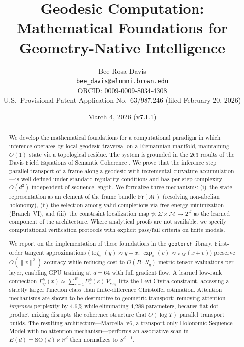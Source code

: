 \documentclass[11pt,a4paper]{article}
\title{\textbf{Geodesic Computation: \\[4pt] Mathematical Foundations for Geometry-Native Intelligence}}
\author{Bee Rosa Davis \\[2pt]
\texttt{bee\_davis@alumni.brown.edu} \\[2pt]
\small{ORCID: 0009-0009-8034-4308} \\[2pt]
\small{U.S.\ Provisional Patent Application No.\ 63/987,246 (filed February 20, 2026)}}
\date{March 4, 2026 (v7.1.1)}
\theoremstyle{definition}
\theoremstyle{remark}
\newcommand{\SO}{\mathrm{SO}}
\newcommand{\Fr}{\mathrm{Fr}}
\begin{document}
\maketitle

\begin{abstract}
We develop the mathematical foundations for a computational paradigm 
in which inference operates by local geodesic traversal on a Riemannian 
manifold, maintaining $O(1)$ state via a topological residue. The 
system is grounded in the 263 results of the Davis Field Equations of 
Semantic Coherence \cite{davis2026field,davis2026navierstokes}. We prove 
that the inference step---parallel transport of a frame along a geodesic 
with incremental curvature accumulation---is well-defined under standard 
regularity conditions and has per-step complexity $O(d^2)$ independent 
of sequence length. We formalize three mechanisms: (i)~the state 
representation as an element of the frame bundle $\Fr(\mathcal{M})$ 
(resolving non-abelian holonomy), (ii)~the selection among valid 
completions via free energy minimization (Branch~VI), and (iii)~the 
constraint localization map $\psi : \Sigma \times \mathcal{M} \to 
2^{\mathcal{A}}$ as the learned component of the architecture. Where 
analytical proofs are not available, we specify computational 
verification protocols with explicit pass/fail criteria on finite models.

We report on the implementation of these foundations in the 
\texttt{geotorch} library. First-order tangent approximations 
($\log_x(y) \approx y - x$, $\exp_x(v) \approx \pi_{\mathcal{M}}(x 
+ v)$) preserve $O(\|v\|^2)$ accuracy while reducing cost to $O(B 
\cdot N_q)$ metric-tensor evaluations per layer, enabling GPU training 
at $d = 64$ with full gradient flow. A learned low-rank connection 
$\Gamma^k_{ij}(x) \approx \sum_{r=1}^{R} U^k_r(x)\, V_{r,ij}$ lifts 
the Levi-Civita constraint, accessing a strictly larger function class 
than finite-difference Christoffel estimation. Attention mechanisms are 
shown to be destructive to geometric transport: removing attention 
\emph{improves} perplexity by 4.6\% while eliminating 4{,}288 
parameters, because flat dot-product mixing disrupts the coherence 
structure that $O(\log T)$ parallel transport builds. The resulting 
architecture---Marcella~v6, a transport-only Holonomic Sequence 
Model with no attention mechanism---performs an associative scan in 
$E(d) = \SO(d) \ltimes \mathbb{R}^d$ then normalizes to $S^{d-1}$.


\end{abstract}
\end{document}
